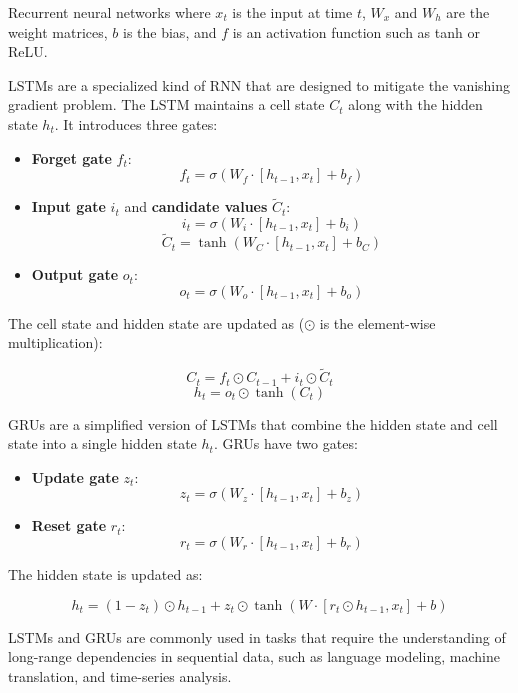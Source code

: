 \documentclass{beamer}
\begin{document}
\begin{columns}
\begin{column}{0.3\textwidth}
\begin{block}{Recurrent neural networks}
where $x_t$ is the input at time $t$, $W_x$ and $W_h$ are the weight matrices, $b$ is the bias, and $f$ is an activation function such as tanh or ReLU.

LSTMs are a specialized kind of RNN that are designed to mitigate the vanishing gradient problem. The LSTM maintains a cell state $C_t$ along with the hidden state $h_t$. It introduces three gates: 

\begin{itemize}
    \item \textbf{Forget gate} $f_t$: 
    \[
    f_t = \sigma(W_f \cdot [h_{t-1}, x_t] + b_f)
    \]
    
    \item \textbf{Input gate} $i_t$ and \textbf{candidate values} $\tilde{C}_t$:
    \[
    i_t = \sigma(W_i \cdot [h_{t-1}, x_t] + b_i)
    \]
    \[
    \tilde{C}_t = \tanh(W_C \cdot [h_{t-1}, x_t] + b_C)
    \]
    
    \item \textbf{Output gate} $o_t$:
    \[
    o_t = \sigma(W_o \cdot [h_{t-1}, x_t] + b_o)
    \]
\end{itemize}

The cell state and hidden state are updated as ($\odot$ is the element-wise multiplication):

\[
C_t = f_t \odot C_{t-1} + i_t \odot \tilde{C}_t
\]
\[
h_t = o_t \odot \tanh(C_t)
\]

GRUs are a simplified version of LSTMs that combine the hidden state and cell state into a single hidden state $h_t$. GRUs have two gates:

\begin{itemize}
    \item \textbf{Update gate} $z_t$:
    \[
    z_t = \sigma(W_z \cdot [h_{t-1}, x_t] + b_z)
    \]
    
    \item \textbf{Reset gate} $r_t$:
    \[
    r_t = \sigma(W_r \cdot [h_{t-1}, x_t] + b_r)
    \]
\end{itemize}

The hidden state is updated as:

\[
h_t = (1 - z_t) \odot h_{t-1} + z_t \odot \tanh(W \cdot [r_t \odot h_{t-1}, x_t] + b)
\]

LSTMs and GRUs are commonly used in tasks that require the understanding of long-range dependencies in sequential data, such as language modeling, machine translation, and time-series analysis.

\end{block}


\end{column}
\end{columns}
\end{document}
